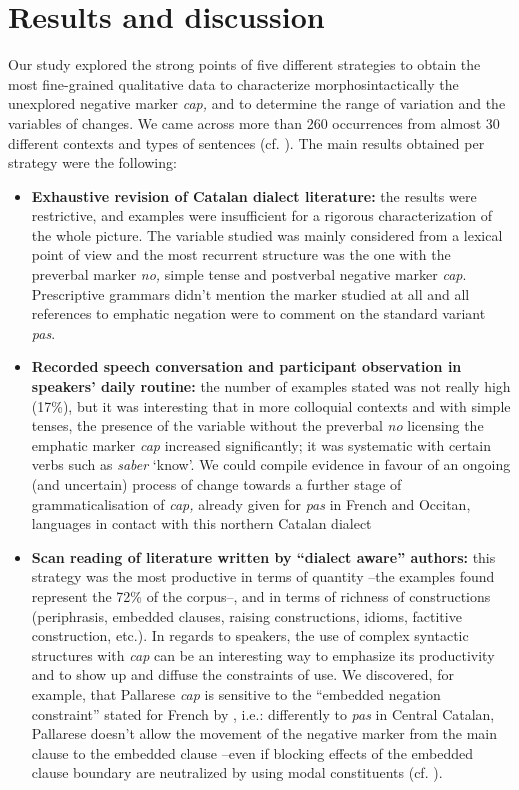 \documentclass[output=paper]{LSP/langsci}
\begin{document}
\section{Results and discussion}
Our study explored the strong points of five different strategies to obtain the most fine-grained qualitative data to characterize morphosintactically the unexplored negative marker \textit{cap, }and to determine the range of variation and the variables of changes. We came across more than 260 occurrences from almost 30 different contexts and types of sentences (cf. \citealt{llop_negacio_2013}). The main results obtained per strategy were the following:

\begin{itemize}
\item \textbf{Exhaustive revision of Catalan dialect literature:} the results were restrictive, and examples were insufficient for a rigorous characterization of the whole picture. The variable studied was mainly considered from a lexical point of view and the most recurrent structure was the one with the preverbal marker \textit{no, }simple tense and postverbal negative marker \textit{cap}. Prescriptive grammars didn’t mention the marker studied at all and all references to emphatic negation were to comment on the standard variant \textit{pas}.
\item \textbf{Recorded speech conversation and participant observation in speakers’ daily routine: }the number of examples stated was not really high (17\%), but it was interesting that in more colloquial contexts and with simple tenses, the presence of the variable without the preverbal \textit{no} licensing the emphatic marker \textit{cap} increased significantly; it was systematic with certain verbs such as \textit{saber }‘know’. We could compile evidence in favour of an ongoing (and uncertain) process of change towards a further stage of grammaticalisation of \textit{cap,} already given for \textit{pas }in French and Occitan, languages in contact with this northern Catalan dialect
\item \textbf{Scan reading of literature written by “dialect aware” authors: }this strategy was the most productive in terms of quantity –the examples found represent the 72\% of the corpus–, and in terms of richness of constructions (periphrasis, embedded clauses, raising constructions, idioms, factitive construction, etc.). In regards to speakers, the use of complex syntactic structures with \textit{cap }can be an interesting way to emphasize its productivity and to show up and diffuse the constraints of use. We discovered, for example, that Pallarese \textit{cap }is sensitive to the “embedded negation constraint” stated for French by \citet[193]{horn_remarks_1978}, i.e.: differently to \textit{pas }in Central Catalan, Pallarese doesn’t allow the movement of the negative marker from the main clause to the embedded clause –even if blocking effects of the embedded clause boundary are neutralized by using modal constituents (cf. \citealt{espinal_two_1993,llop_negacio_2013}).

\end{itemize}
\end{document}
